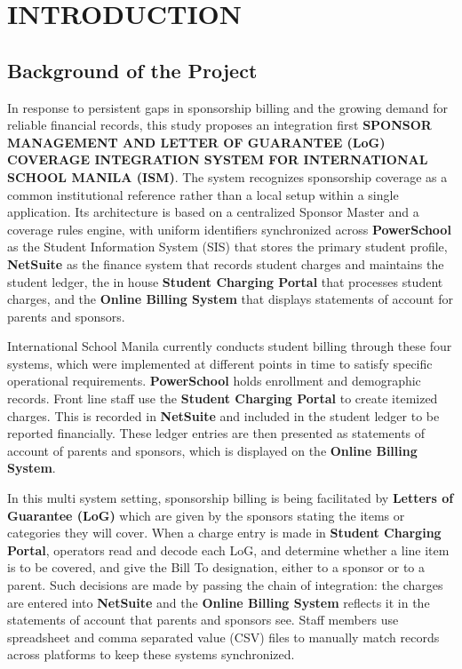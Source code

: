 
\section{INTRODUCTION}

\subsection{Background of the Project}

    In response to persistent gaps in sponsorship billing and the growing demand for reliable financial records, this study proposes an integration first \textbf{SPONSOR MANAGEMENT AND LETTER OF GUARANTEE (LoG) COVERAGE INTEGRATION SYSTEM FOR INTERNATIONAL SCHOOL MANILA (ISM)}. The system recognizes sponsorship coverage as a common institutional reference rather than a local setup within a single application. Its architecture is based on a centralized Sponsor Master and a coverage rules engine, with uniform identifiers synchronized across  \textbf{PowerSchool} as the Student Information System (SIS) that stores the primary student profile,  \textbf{NetSuite} as the finance system that records student charges and maintains the student ledger, the in house  \textbf{Student Charging Portal} that processes student charges, and the  \textbf{Online Billing System} that displays statements of account for parents and sponsors. 
    
    International School Manila currently conducts student billing through these four systems, which were implemented at different points in time to satisfy specific operational requirements. \textbf{PowerSchool} holds enrollment and demographic records. Front line staff use the \textbf{Student Charging Portal} to create itemized charges. This is recorded in  \textbf{NetSuite} and included in the student ledger to be reported financially. These ledger entries are then presented as statements of account of parents and sponsors, which is displayed on the  \textbf{Online Billing System}.

    In this multi system setting, sponsorship billing is being facilitated by \textbf{Letters of Guarantee (LoG)} which are given by the sponsors stating the items or categories they will cover. When a charge entry is made in  \textbf{Student Charging Portal}, operators read and decode each LoG, and determine whether a line item is to be covered, and give the Bill To designation, either to a sponsor or to a parent. Such decisions are made by passing the chain of integration: the charges are entered into  \textbf{NetSuite} and the  \textbf{Online Billing System} reflects it in the statements of account that parents and sponsors see. Staff members use spreadsheet and comma separated value (CSV) files to manually match records across platforms to keep these systems synchronized.
    
